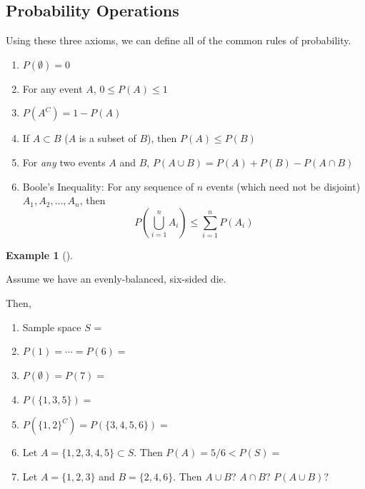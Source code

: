 \documentclass[
  letterpaper,
]{book}
\providecommand{\tightlist}{%
  \setlength{\itemsep}{0pt}\setlength{\parskip}{0pt}}\usepackage{longtable,booktabs,array}
\theoremstyle{definition}
\theoremstyle{definition}
\newtheorem{example}{Example}[chapter]
\theoremstyle{plain}
\theoremstyle{definition}
\theoremstyle{plain}
\theoremstyle{plain}
\theoremstyle{remark}
\begin{document}
\hypertarget{probability-operations}{%
\subsection*{Probability Operations}\label{probability-operations}}

Using these three axioms, we can define all of the common rules of
probability.

\hypertarget{prop-prob}{}
\begin{enumerate}
\def\labelenumi{\arabic{enumi}.}
\tightlist
\item
  \(P(\emptyset)=0\)
\item
  For any event \(A\), \(0\le P(A) \le 1\)
\item
  \(P({A}^C)=1-P(A)\)
\item
  If \(A\subset B\) (\(A\) is a subset of \(B\)), then \(P(A)\le P(B)\)
\item
  For \emph{any} two events \(A\) and \(B\),
  \(P(A\cup B)=P(A)+P(B)-P(A\cap B)\)
\item
  Boole's Inequality: For any sequence of \(n\) events (which need not
  be disjoint) \(A_1,A_2,\ldots,A_n\), then
  \[P\left( \bigcup\limits_{i=1}^n A_i\right) \leq \sum\limits_{i=1}^n P(A_i)\]
\end{enumerate}

\leavevmode{}%
\begin{example}[]\label{exm-prob}

Assume we have an evenly-balanced, six-sided die.

Then,

\begin{enumerate}
\def\labelenumi{\arabic{enumi}.}
\tightlist
\item
  Sample space \(S\) =
\item
  \(P(1)=\cdots=P(6)=\)
\item
  \(P(\emptyset)=P(7)=\)
\item
  \(P\left( \{ 1, 3, 5 \} \right)=\)
\item
  \(P\left( \{ 1, 2 \}^C \right)= P\left( \{ 3, 4, 5, 6 \}\right)=\)
\item
  Let \(A=\{ 1,2,3,4,5 \}\subset S\). Then \(P(A)=5/6<P(S)=\)
\item
  Let \(A=\{ 1, 2, 3 \}\) and \(B=\{ 2, 4, 6 \}\). Then \(A\cup B\)?
  \(A\cap B\)? \(P(A \cup B)\)?
\end{enumerate}

\end{example}
\end{document}

